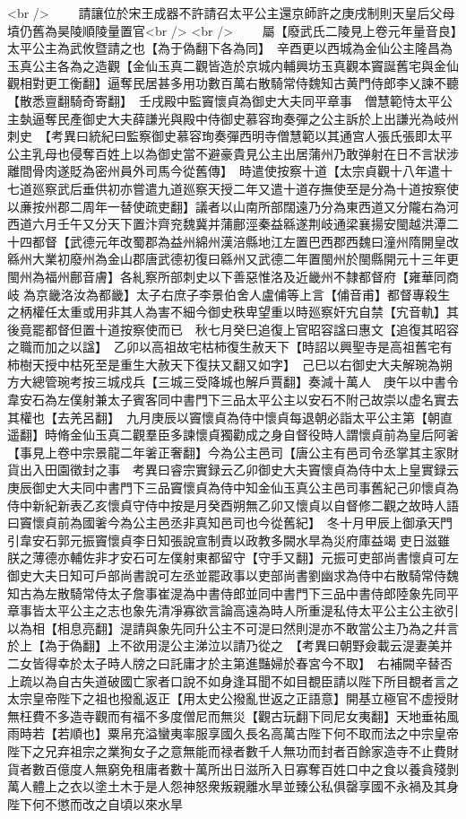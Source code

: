 <br />
　　請讓位於宋王成器不許請召太平公主還京師許之庚戌制則天皇后父母墳仍舊為昊陵順陵量置官<br />
<br />
　　屬【廢武氏二陵見上卷元年量音良】太平公主為武攸暨請之也【為于偽翻下各為同】　辛酉更以西城為金仙公主隆昌為玉真公主各為之造觀【金仙玉真二觀皆造於京城内輔興坊玉真觀本竇誕舊宅與金仙觀相對更工衡翻】逼奪民居甚多用功數百萬右散騎常侍魏知古黄門侍郎李乂諫不聽【散悉亶翻騎奇寄翻】　壬戌殿中監竇懷貞為御史大夫同平章事　僧慧範恃太平公主埶逼奪民產御史大夫薛謙光與殿中侍御史慕容珣奏彈之公主訴於上出謙光為岐州刺史　【考異曰統紀曰監察御史慕容珣奏彈西明寺僧慧範以其通宫人張氏張即太平公主乳母也侵奪百姓上以為御史當不避豪貴見公主出居蒲州乃敢弹射在日不言狀涉離間骨肉遂貶為密州員外司馬今從舊傳】　時遣使按察十道【太宗貞觀十八年遣十七道廵察武后垂供初亦嘗遣九道廵察天授二年又遣十道存撫使至是分為十道按察使以亷按州郡二周年一替使疏吏翻】議者以山南所部闊遠乃分為東西道又分隴右為河西道六月壬午又分天下置汴齊兖魏冀并蒲鄜涇秦益緜遂荆岐通梁襄揚安閩越洪潭二十四都督【武德元年改蜀郡為益州綿州漢涪縣地江左置巴西郡西魏曰潼州隋開皇改緜州大業初廢州為金山郡唐武德初復曰緜州又武德二年置閩州於閩縣開元十三年更閩州為福州鄜音膚】各糺察所部刺史以下善惡惟洛及近畿州不隸都督府【雍華同商岐為京畿洛汝為都畿】太子右庶子李景伯舍人盧俌等上言【俌音甫】都督專殺生之柄權任太重或用非其人為害不細今御史秩卑望重以時廵察奸宄自禁【宄音軌】其後竟罷都督但置十道按察使而已　秋七月癸巳追復上官昭容諡曰惠文【追復其昭容之職而加之以諡】　乙卯以高祖故宅枯柿復生赦天下【時詔以興聖寺是高祖舊宅有柿樹天授中枯死至是重生大赦天下復扶又翻又如字】　己巳以右御史大夫解琬為朔方大總管琬考按三城戍兵【三城三受降城也解戶賈翻】奏減十萬人　庚午以中書令韋安石為左僕射兼太子賓客同中書門下三品太平公主以安石不附己故崇以虚名實去其權也【去羌呂翻】　九月庚辰以竇懷貞為侍中懷貞每退朝必詣太平公主第【朝直遥翻】時脩金仙玉真二觀羣臣多諫懷貞獨勸成之身自督役時人謂懷貞前為皇后阿㸙【事見上卷中宗景龍二年㸙正奢翻】今為公主邑司【唐公主有邑司令丞掌其主家財貨出入田園徵封之事　考異曰睿宗實録云乙卯御史大夫竇懷貞為侍中太上皇實録云庚辰御史大夫同中書門下三品竇懷貞為侍中知金仙玉真公主邑司事舊紀己卯懷貞為侍中新紀新表乙亥懷貞守侍中按是月癸酉朔無乙卯又懷貞以自督修二觀之故時人語曰竇懷貞前為國㸙今為公主邑丞非真知邑司也今從舊紀】　冬十月甲辰上御承天門引韋安石郭元振竇懷貞李日知張說宣制責以政教多闕水旱為災府庫益竭吏日滋雖朕之薄德亦輔佐非才安石可左僕射東都留守【守手又翻】元振可吏部尚書懷貞可左御史大夫日知可戶部尚書說可左丞並罷政事以吏部尚書劉幽求為侍中右散騎常侍魏知古為左散騎常侍太子詹事崔湜為中書侍郎並同中書門下三品中書侍郎陸象先同平章事皆太平公主之志也象先清凈寡欲言論高遠為時人所重湜私侍太平公主公主欲引以為相【相息亮翻】湜請與象先同升公主不可湜曰然則湜亦不敢當公主乃為之幷言於上【為于偽翻】上不欲用湜公主涕泣以請乃從之　【考異曰朝野僉載云湜妻美并二女皆得幸於太子時人牓之曰託庸才於主第進豔婦於春宮今不取】　右補闕辛替否上疏以為自古失道破國亡家者口說不如身逢耳聞不如目覩臣請以陛下所目覩者言之太宗皇帝陛下之祖也撥亂返正【用太史公撥亂世返之正語意】開基立極官不虚授財無枉費不多造寺觀而有福不多度僧尼而無災【觀古玩翻下同尼女夷翻】天地垂祐風雨時若【若順也】粟帛充溢蠻夷率服享國久長名高萬古陛下何不取而法之中宗皇帝陛下之兄弃祖宗之業狥女子之意無能而禄者數千人無功而封者百餘家造寺不止費財貨者數百億度人無窮免租庸者數十萬所出日滋所入日寡奪百姓口中之食以養貪殘剝萬人體上之衣以塗土木于是人怨神怒衆叛親離水旱並臻公私俱罄享國不永禍及其身陛下何不懲而改之自頃以來水旱